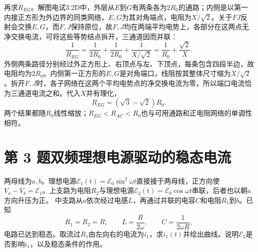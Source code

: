 \documentclass[UTF8,fontset=fandol,a4paper,11pt]{ctexart}
\begin{document}
再求$R_{EG}$。解图电试3.2D中，外层从$E$到$G$有两条各为$2R_0$的通路；内侧是以第一内接正方形为外边界的同类网络，$E,G$为其对角端点，电阻为$X/\sqrt2$。关于$FJ$反射会交换$E,G$，而$F,J$保持原位，故$F,J$均在两端平均电势上，各部分在这两点无净交换电流，可将这些等势结点拆开，三通道因而并联：
\[
\frac1{R_{EG}}=\frac1{2R_0}+\frac1{2R_0}
+\frac1{X/\sqrt2}
=\frac1{R_0}+\frac{\sqrt2}{X}.
\]
外侧两条路径分别经过外正方形上、右顶点与左、下顶点，每条包含四段半边，故电阻均为$2R_0$。内侧第一正方形的$E,G$是对角端口，线阻按其整体尺寸缩为$X/\sqrt2$。拆开$F,J$时，各子网络在这两个平均电势点的净交换电流为零，所以端口电流恰为三通道电流之和。代入$X$并有理化，
\[
\boxed{R_{EG}=(\sqrt3-\sqrt2)R_0}.
\]
两个结果都随$R_0$线性缩放；$R_{EG}<R_{AC}<R_0$也与可用通路和正电阻网络的单调性相符。




\section*{第 3 题\quad 双频理想电源驱动的稳态电流}\label{q:3}


两母线为$a,b$。理想电源$\mathcal E_1(t)=\mathcal E_0\sin^2\omega t$直接接于两母线，正方向使$V_a-V_b=\mathcal E_1$。上支路为电阻$R_2$与理想电源$\mathcal E_2(t)=\mathcal E_0\cos\omega t$串联，后者也以朝$a$方向升压为正。
中支路从$a$依次经过电感$L$，再通过并联的电容$C$和电阻$R_1$到$b$。已知
\[
R_1=R_2=R,\qquad L=\frac R{2\omega},\qquad
C=\frac1{2\omega R},
\]
电路已达到稳态。取流过$R_1$由左向右的电流为$i_1$，求$i_1(t)$并绘出曲线。说明$\mathcal E_2$是否影响$i_1$，以及稳态条件的作用。
\end{document}
